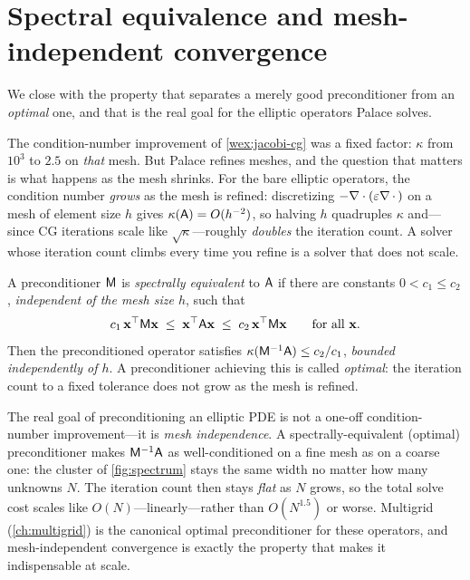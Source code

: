 \section{Spectral equivalence and mesh-independent convergence}
\label{sec:meshindep}

We close with the property that separates a merely good preconditioner from an
\emph{optimal} one, and that is the real goal for the elliptic operators Palace solves.

The condition-number improvement of \cref{wex:jacobi-cg} was a fixed factor: $\kappa$ from
$10^3$ to $2.5$ on \emph{that} mesh. But Palace refines meshes, and the question that
matters is what happens as the mesh shrinks. For the bare elliptic operators, the condition
number \emph{grows} as the mesh is refined: discretizing $-\nabla\cdot(\varepsilon\nabla\,\cdot\,)$
on a mesh of element size $h$ gives $\kappa(\mathsf{A})=O(h^{-2})$, so halving $h$ quadruples
$\kappa$ and---since CG iterations scale like $\sqrt\kappa$---roughly \emph{doubles} the
iteration count. A solver whose iteration count climbs every time you refine is a solver
that does not scale.

\begin{definition}
\label{def:specequiv}
A preconditioner $\mathsf{M}$ is \emph{spectrally equivalent} to $\mathsf{A}$ if there are
constants $0<c_1\le c_2$, \emph{independent of the mesh size $h$}, such that
\[
  c_1\,\mathbf{x}^{\top}\mathsf{M}\mathbf{x} \;\le\; \mathbf{x}^{\top}\mathsf{A}\mathbf{x} \;\le\; c_2\,\mathbf{x}^{\top}\mathsf{M}\mathbf{x}
  \qquad\text{for all }\mathbf{x}.
\]
Then the preconditioned operator satisfies $\kappa(\mathsf{M}^{-1}\mathsf{A})\le c_2/c_1$,
\emph{bounded independently of $h$}. A preconditioner achieving this is called
\emph{optimal}: the iteration count to a fixed tolerance does not grow as the mesh is
refined.
\end{definition}

\begin{keyidea}
The real goal of preconditioning an elliptic PDE is not a one-off condition-number
improvement---it is \emph{mesh independence}. A spectrally-equivalent (optimal)
preconditioner makes $\mathsf{M}^{-1}\mathsf{A}$ as well-conditioned on a fine mesh as on a coarse
one: the cluster of \cref{fig:spectrum} stays the same width no matter how many unknowns
$N$. The iteration count then stays \emph{flat} as $N$ grows, so the total solve cost scales
like $O(N)$---linearly---rather than $O(N^{1.5})$ or worse. Multigrid (\cref{ch:multigrid})
is the canonical optimal preconditioner for these operators, and mesh-independent
convergence is exactly the property that makes it indispensable at scale.
\end{keyidea}

